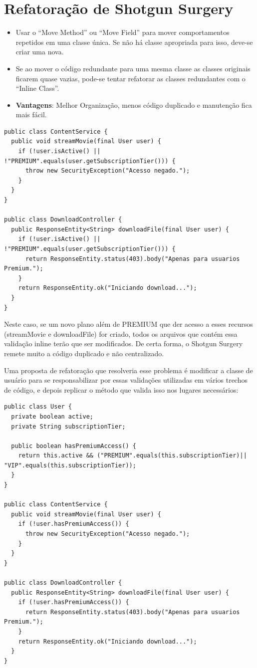 \documentclass[12pt,a4paper]{article}
\begin{document}
\section{Refatoração de Shotgun Surgery}
\begin{itemize}
    \item Usar o “Move Method” ou “Move Field” para mover comportamentos repetidos em uma classe única. Se não há classe apropriada para isso, deve-se criar uma nova.
    \item Se ao mover o código redundante para uma mesma classe as classes originais ficarem quase vazias, pode-se tentar refatorar as classes redundantes com o “Inline Class”.
    \item \textbf{Vantagens}: Melhor Organização, menos código duplicado e manutenção fica mais fácil.

\end{itemize}
\begin{lstlisting}[caption={Regra de acesso espalhada},label={lst:shotgun-before}]
public class ContentService {
  public void streamMovie(final User user) {
    if (!user.isActive() || !"PREMIUM".equals(user.getSubscriptionTier())) {
      throw new SecurityException("Acesso negado.");
    }
  }
}

public class DownloadController {
  public ResponseEntity<String> downloadFile(final User user) {
    if (!user.isActive() || !"PREMIUM".equals(user.getSubscriptionTier())) {
      return ResponseEntity.status(403).body("Apenas para usuarios Premium.");
    }
    return ResponseEntity.ok("Iniciando download...");
  }
}
\end{lstlisting}

Neste caso, se um novo plano além de PREMIUM que der acesso a esses recursos (streamMovie e downloadFile) for criado, todos os arquivos que contém essa validação inline terão que ser modificados. De certa forma, o Shotgun Surgery remete muito a código duplicado e não centralizado.

Uma proposta de refatoração que resolveria esse problema é modificar a classe de usuário para se responsabilizar por essas validações utilizadas em vários trechos de código, e depois replicar o método que valida isso nos lugares necessários:

\begin{lstlisting}[caption={Regra de acesso concentrada em User},label={lst:shotgun-after}]
public class User {
  private boolean active;
  private String subscriptionTier;

  public boolean hasPremiumAccess() {
    return this.active && ("PREMIUM".equals(this.subscriptionTier)|| "VIP".equals(this.subscriptionTier));
  }
}

public class ContentService {
  public void streamMovie(final User user) {
    if (!user.hasPremiumAccess()) {
      throw new SecurityException("Acesso negado.");
    }
  }
}

public class DownloadController {
  public ResponseEntity<String> downloadFile(final User user) {
    if (!user.hasPremiumAccess()) {
      return ResponseEntity.status(403).body("Apenas para usuarios Premium.");
    }
    return ResponseEntity.ok("Iniciando download...");
  }
}
\end{lstlisting}
\end{document}
